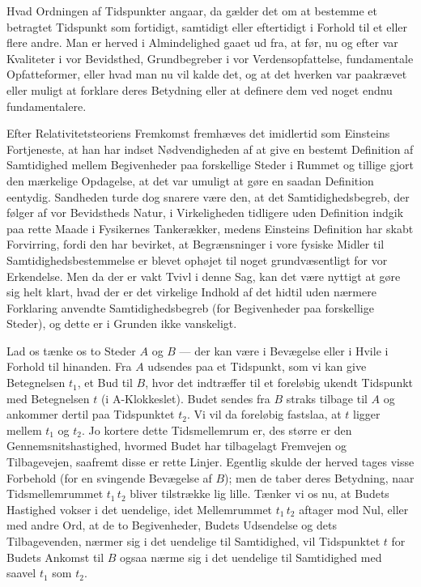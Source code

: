 \documentclass[12pt,a4paper]{article}
\newcommand{\opage}[1]{\marginnote{\footnotesize\textit{[#1]}}}
\begin{document}
Hvad Ordningen af Tidspunkter angaar, da gælder det om at bestemme et betragtet
Tidspunkt som fortidigt, samtidigt eller eftertidigt i Forhold til et eller
flere andre. Man er herved i Almindelighed gaaet ud fra, at før, nu og efter
var \guillemotright Kvaliteter i vor Bevidsthed\guillemotleft, Grundbegreber i
vor Verdensopfattelse, fundamentale Opfatteformer, eller hvad man nu vil kalde
det, og at det hverken var paakrævet eller muligt at forklare deres Betydning
eller at definere dem ved noget endnu fundamentalere.

Efter Relativitetsteoriens Fremkomst fremhæves det imidlertid som Einsteins
Fortjeneste, at han har indset Nødvendigheden af at give en bestemt Definition
af Samtidighed mellem Begivenheder paa forskellige Steder i Rummet og tillige
gjort den mærkelige Opdagelse, at det var umuligt at gøre en saadan Definition
eentydig. Sandheden turde dog snarere være den, at det Samtidighedsbegreb, der
følger af vor Bevidstheds Natur, i Virkeligheden tidligere uden Definition
indgik paa rette Maade i Fysikernes Tankerækker, medens Einsteins Definition
har skabt Forvirring, fordi den har bevirket, at Begrænsninger i vore fysiske
Midler til Samtidighedsbestemmelse er blevet ophøjet til noget grundvæsentligt
for vor Erkendelse. Men da der er vakt Tvivl i denne Sag, kan det være nyttigt
at gøre sig helt klart, hvad der er det virkelige Indhold af det hidtil uden
nærmere Forklaring anvendte Samtidighedsbegreb (for Begivenheder paa
forskellige Steder), og dette er i Grunden ikke vanskeligt.

Lad os tænke os to Steder $A$ og $B$ --- der kan være i Bevægelse eller i Hvile
i Forhold til hinanden. Fra $A$ udsendes paa et Tidspunkt, som vi kan give
Betegnelsen $t_{1}$, et Bud til $B$, hvor det indtræffer til et foreløbig
ukendt Tidspunkt med Betegnelsen $t$ (i A-Klokkeslet). Budet sendes fra $B$
straks tilbage til $A$ og ankommer dertil paa Tidspunktet $t_{2}$. Vi vil da
foreløbig fastslaa, at $t$ ligger mellem $t_{1}$ og $t_{2}$. Jo kortere dette
Tidsmellemrum er, des større er den Gennemsnitshastighed, hvormed Budet har
tilbagelagt Fremvejen og Tilbagevejen, saafremt disse er rette Linjer. Egentlig
skulde der herved tages visse Forbehold (for en svingende Bevægelse af $B$);
men de taber deres Betydning, naar Tidsmellemrummet $t_{1}\,t_{2}$ bliver
tilstrække\-%
\opage{3}lig lille. Tænker vi os nu, at Budets Hastighed vokser i det uendelige, idet
Mellemrummet $t_{1}\,t_{2}$ aftager mod Nul, eller med andre Ord, at de to
Begivenheder, Budets Udsendelse og dets Tilbagevenden, nærmer sig i det
uendelige til Samtidighed, vil Tidspunktet $t$ for Budets Ankomst til $B$ ogsaa
nærme sig i det uendelige til Samtidighed med saavel $t_{1}$ som $t_{2}$.
\end{document}
